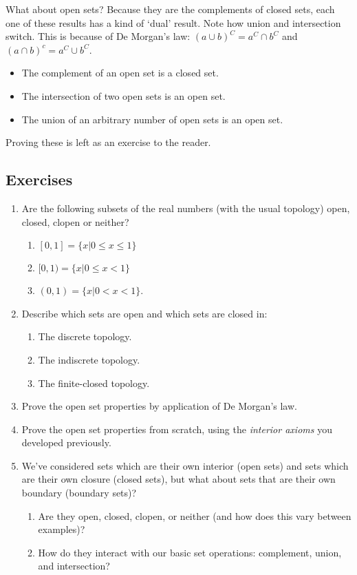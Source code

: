 \documentclass{report}
\begin{document}
What about open sets? Because they are the complements of closed sets, each one of these results has a kind of `dual' result. Note how union and intersection switch. This is because of De Morgan's law: $(a ∪ b)^C = a^C ∩ b^C$ and $(a ∩ b)^c = a^C ∪ b^C$.

\begin{itemize}
\item The complement of an open set is a closed set.
\item The intersection of two open sets is an open set.
\item The union of an arbitrary number of open sets is an open set.
\end{itemize}

Proving these is left as an exercise to the reader.

\subsection*{Exercises}

\begin{enumerate}

\item Are the following subsets of the real numbers (with the usual topology) open, closed, clopen or neither?
\begin{enumerate}
\item $[0,1] = \{x | 0 ≤ x ≤ 1\}$
\item $[0,1) = \{x | 0 ≤ x < 1\}$
\item $(0,1) = \{x | 0 < x < 1\}$.
\end{enumerate}

\item Describe which sets are open and which sets are closed in:

\begin{enumerate}
\item The discrete topology.
\item The indiscrete topology.
\item The finite-closed topology.
\end{enumerate}

\item Prove the open set properties by application of De Morgan's law.

\item Prove the open set properties from scratch, using the \emph{interior axioms} you developed previously.

\item We've considered sets which are their own interior (open sets) and sets which are their own closure (closed sets), but what about sets that are their own boundary (boundary sets)? 
\begin{enumerate}
\item Are they open, closed, clopen, or neither (and how does this vary between examples)?
\item How do they interact with our basic set operations: complement, union, and intersection?
\end{enumerate}

\end{enumerate}
\end{document}
